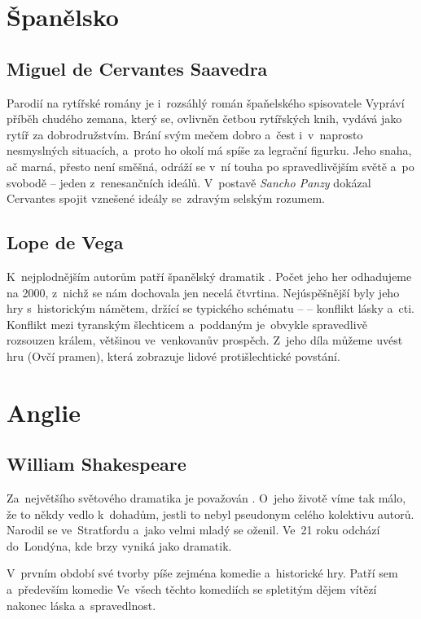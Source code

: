 \section{Španělsko}
\subsection*{Miguel de Cervantes Saavedra}
Parodií na rytířské romány je i~rozsáhlý román špaňelského spisovatele  
 Vypráví příběh chudého zemana, který se, ovlivněn četbou rytířských knih, 
vydává jako rytíř za dobrodružstvím. Brání svým mečem dobro a~čest i~v~naprosto nesmyslných situacích, a~proto ho okolí
má spíše za legrační figurku. Jeho snaha, ač marná, přesto není směšná, odráží se v~ní touha po spravedlivějším světě
a~po svobodě -- jeden z~renesančních ideálů. V~postavě \textit{Sancho Panzy} dokázal Cervantes spojit vznešené ideály
se~zdravým selským rozumem.

\subsection*{Lope de Vega}
K~nejplodnějším autorům patří španělský dramatik . Počet jeho her odhadujeme na 2000,
z~nichž se nám dochovala jen necelá čtvrtina. Nejúspěšnější byly jeho hry s~historickým námětem, držící se 
typického schématu --  -- konflikt lásky a~cti. Konflikt mezi tyranským šlechticem a~poddaným 
je~obvykle spravedlivě rozsouzen králem, většinou ve~venkovanův prospěch. Z~jeho díla můžeme uvést hru 
(Ovčí pramen), která zobrazuje lidové protišlechtické povstání.

\section{Anglie}
\subsection*{William Shakespeare}
Za~největšího světového dramatika je považován . O~jeho životě víme tak málo, že to někdy
vedlo k~dohadům, jestli to nebyl pseudonym celého kolektivu autorů. Narodil se ve~Stratfordu a~jako velmi mladý se oženil.
Ve~21 roku odchází do~Londýna, kde brzy vyniká jako dramatik.

V~prvním období své tvorby píše zejména komedie a~historické hry. Patří sem  
   
 a~především komedie 
Ve~všech těchto komediích se spletitým dějem vítězí nakonec láska a~spravedlnost.

